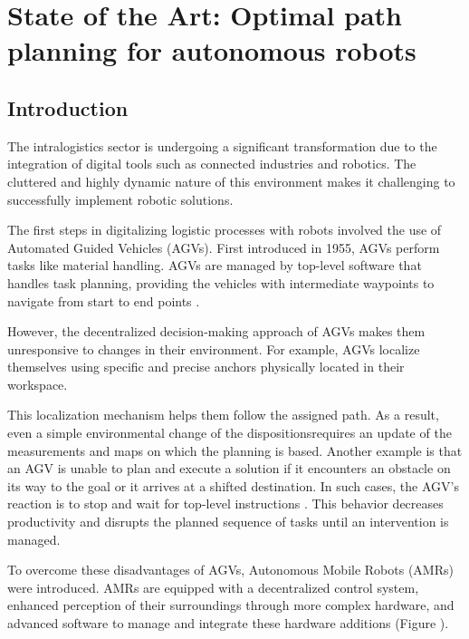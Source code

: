 \chapter{State of the Art: Optimal path planning for autonomous robots}

\renewcommand{\chaptername}{Chapter}

\section*{Introduction}

The intralogistics sector is undergoing a significant transformation due to the 
integration of digital tools such as connected industries and robotics. The cluttered 
and highly dynamic nature of this environment makes it challenging to successfully 
implement robotic solutions.

The first steps in digitalizing logistic processes with robots involved the use of 
Automated Guided Vehicles (AGVs). First introduced in 1955, AGVs perform tasks like 
material handling. AGVs are managed by top-level software that handles task planning, 
providing the vehicles with intermediate waypoints to navigate from start to end points \cite{R7}. 

However, the decentralized decision-making approach of AGVs makes them 
unresponsive to changes in their environment. For example, AGVs localize themselves 
using specific and precise anchors physically located in their workspace. 

This localization mechanism helps them follow the assigned path. As a result, even 
a simple environmental change of the dispositionsrequires an update of the measurements 
and maps on  which the planning is based. Another example is that an AGV is unable to plan and 
execute a solution if it encounters an obstacle on its way to the goal or it arrives at a shifted 
destination. In such cases, 
the AGV’s reaction is to stop and wait for top-level instructions \cite{R8}. This behavior 
decreases productivity and disrupts the planned sequence of tasks until an intervention is managed.

To overcome these disadvantages of AGVs, Autonomous Mobile Robots (AMRs) were introduced. 
AMRs are equipped with a decentralized control system, enhanced perception of their 
surroundings through more complex hardware, and advanced software to manage and integrate 
these hardware additions (Figure ).


